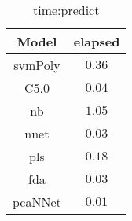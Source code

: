 \begin{table}[!ht]
	\centering
	\begin{tabular}{|c|c|}
		\hline
		Model & elapsed \\ \hline
		svmPoly & $0.36$ \\ \hline
		C5.0 & $0.04$ \\ \hline
		nb & $1.05$ \\ \hline
		nnet & $0.03$ \\ \hline
		pls & $0.18$ \\ \hline
		fda & $0.03$ \\ \hline
		pcaNNet & $0.01$ \\ \hline
	\end{tabular}
	\caption{time:predict}
	\label{tab:time:predict}
\end{table}
